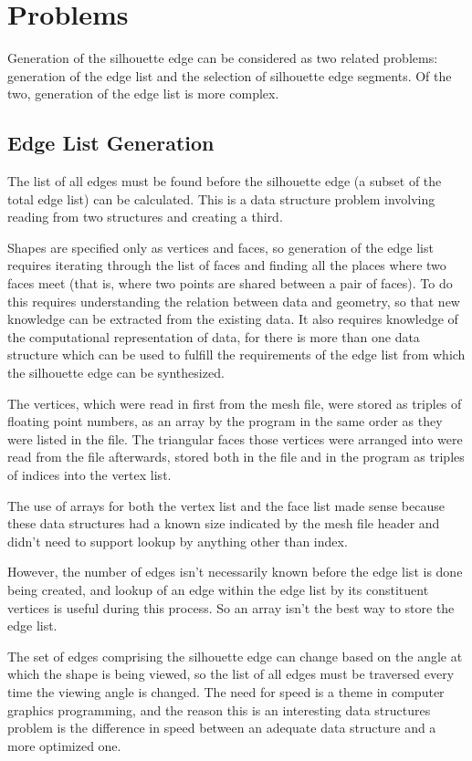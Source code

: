 \documentclass[10pt,twocolumn]{article}
\begin{document}
\section{Problems}
Generation of the silhouette edge can be considered as two related problems: generation of the edge list and the selection of silhouette edge segments.  Of the two, generation of the edge list is more complex.  

\subsection{Edge List Generation}
The list of all edges must be found before the silhouette edge (a subset of the total edge list) can be calculated.  This is a data structure problem involving reading from two structures and creating a third.  

Shapes are specified only as vertices and faces, so generation of the edge list requires iterating through the list of faces and finding all the places where two faces meet (that is, where two points are shared between a pair of faces).  To do this requires understanding the relation between data and geometry, so that new knowledge can be extracted from the existing data.  It also requires knowledge of the computational representation of data, for there is more than one data structure which can be used to fulfill the requirements of the edge list from which the silhouette edge can be synthesized.  

The vertices, which were read in first from the mesh file, were stored as triples of floating point numbers, as an array by the program in the same order as they were listed in the file.  The triangular faces those vertices were arranged into were read from the file afterwards, stored both in the file and in the program as triples of indices into the vertex list.  

The use of arrays for both the vertex list and the face list made sense because these data structures had a known size indicated by the mesh file header and didn't need to support lookup by anything other than index.  

However, the number of edges isn't necessarily known before the edge list is done being created, and lookup of an edge within the edge list by its constituent vertices is useful during this process.  So an array isn't the best way to store the edge list.  

The set of edges comprising the silhouette edge can change based on the angle at which the shape is being viewed, so the list of all edges must be traversed every time the viewing angle is changed.  The need for speed is a theme in computer graphics programming, and the reason this is an interesting data structures problem is the difference in speed between an adequate data structure and a more optimized one.  
\end{document}
